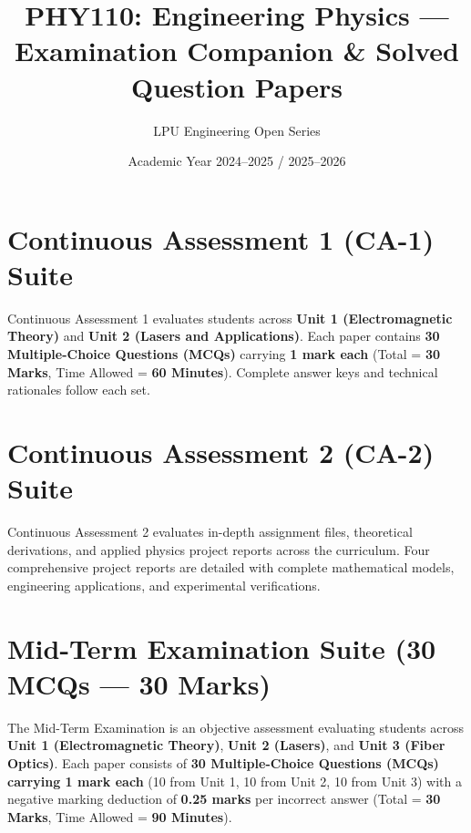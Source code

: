 \documentclass[a4paper,11pt,oneside,openany]{book}
\title{PHY110: Engineering Physics --- Examination Companion \& Solved Question Papers}
\author{LPU Engineering Open Series}
\date{Academic Year 2024--2025 / 2025--2026}
\begin{document}
\frontmatter



\tableofcontents
\newpage

\mainmatter

\chapter{Continuous Assessment 1 (CA-1) Suite}
\label{chap:ca1}
\noindent
Continuous Assessment 1 evaluates students across \textbf{Unit 1 (Electromagnetic Theory)} and \textbf{Unit 2 (Lasers and Applications)}. Each paper contains \textbf{30 Multiple-Choice Questions (MCQs)} carrying \textbf{1 mark each} (Total = \textbf{30 Marks}, Time Allowed = \textbf{60 Minutes}). Complete answer keys and technical rationales follow each set.

\newpage

\newpage

\newpage

\newpage


\chapter{Continuous Assessment 2 (CA-2) Suite}
\label{chap:ca2}
\noindent
Continuous Assessment 2 evaluates in-depth assignment files, theoretical derivations, and applied physics project reports across the curriculum. Four comprehensive project reports are detailed with complete mathematical models, engineering applications, and experimental verifications.

\newpage

\newpage

\newpage

\newpage


\chapter{Mid-Term Examination Suite (30 MCQs --- 30 Marks)}
\label{chap:midterm}
\noindent
The Mid-Term Examination is an objective assessment evaluating students across \textbf{Unit 1 (Electromagnetic Theory)}, \textbf{Unit 2 (Lasers)}, and \textbf{Unit 3 (Fiber Optics)}. Each paper consists of \textbf{30 Multiple-Choice Questions (MCQs) carrying 1 mark each} (10 from Unit 1, 10 from Unit 2, 10 from Unit 3) with a negative marking deduction of \textbf{0.25 marks} per incorrect answer (Total = \textbf{30 Marks}, Time Allowed = \textbf{90 Minutes}).
\end{document}

